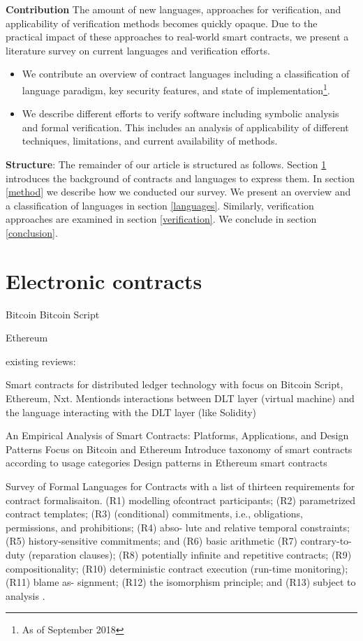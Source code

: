\documentclass{article}
\begin{document}
\textbf{Contribution} The amount of new languages, approaches for verification, and applicability of verification methods becomes quickly opaque. Due to the practical impact of these approaches to real-world smart contracts, we present a literature survey on current languages and verification efforts.
\begin{itemize}
\item We contribute an overview of contract languages including a classification of language paradigm, key security features, and state of implementation\footnote{As of September 2018}.
\item We describe different efforts to verify software including symbolic analysis and formal verification. This includes an analysis of applicability of different techniques, limitations, and current availability of methods.
\end{itemize}

\textbf{Structure}: The remainder of our article is structured as follows. Section \ref{background} introduces the background of contracts and languages to express them. In section \ref{method} we describe how we conducted our survey. We present an overview and a classification of languages in section \ref{languages}. Similarly, verification approaches are examined in section \ref{verification}. We conclude in section \ref{conclusion}.


\section{Electronic contracts}
\label{background}

Bitcoin \cite{Nakamoto2008}
Bitcoin Script \cite{BitcoinWiki2018Script}

Ethereum \cite{Buterin2013,Wood2014}

existing reviews:

Smart contracts for distributed ledger technology with focus on Bitcoin Script, Ethereum, Nxt. Mentionds interactions between DLT layer (virtual machine) and the language interacting with the DLT layer (like Solidity)
\cite{Seijas2017}


An Empirical Analysis of Smart Contracts: Platforms, Applications, and Design Patterns
Focus on Bitcoin and Ethereum
Introduce taxonomy of smart contracts according to usage categories
Design patterns in Ethereum smart contracts
\cite{Bartoletti2017}

Survey of Formal Languages for Contracts with a list of thirteen requirements for contract formalisaiton.
(R1) modelling ofcontract participants; (R2) parametrized contract templates; (R3) (conditional) commitments, i.e., obligations, permissions, and prohibitions; (R4) abso- lute and relative temporal constraints; (R5) history-sensitive commitments; and (R6) basic arithmetic
(R7) contrary-to-duty (reparation clauses); (R8) potentially infinite and repetitive contracts; (R9) compositionality; (R10) deterministic contract execution (run-time monitoring); (R11) blame as- signment; (R12) the isomorphism principle; and (R13) subject to analysis
 \cite{Hvitved2010}.
 
\end{document}
